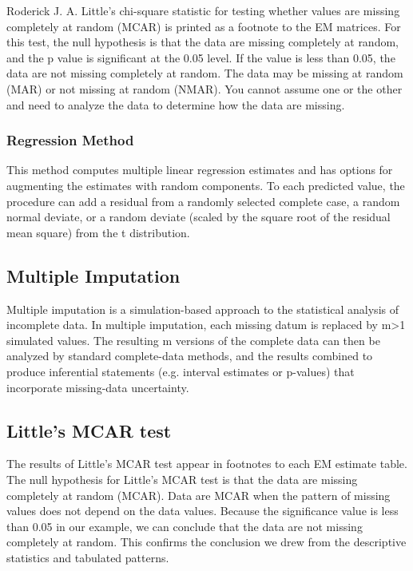 Roderick J. A. Little's chi-square statistic for testing whether values are missing completely at random (MCAR) is printed as a footnote to the EM matrices. For this test, the null hypothesis is that the data are missing completely at random, and the p value is significant at the 0.05 level. If the value is less than 0.05, the data are not missing completely at random. The data may be missing at random (MAR) or not missing at random (NMAR). You cannot assume one or the other and need to analyze the data to determine how the data are missing.

\subsubsection*{Regression Method}

This method computes multiple linear regression estimates and has options for augmenting the estimates with random components. To each predicted value, the procedure can add a residual from a randomly selected complete case, a random normal deviate, or a random deviate (scaled by the square root of the residual mean square) from the t distribution.
\subsection{Multiple Imputation}

Multiple imputation is a simulation-based approach to the statistical analysis of incomplete data. In multiple imputation, each missing datum is replaced by m>1 simulated values. The resulting m versions of the complete data can then be analyzed by standard complete-data methods, and the results combined to produce inferential statements (e.g. interval estimates or p-values) that incorporate missing-data uncertainty.

\subsection{Little's MCAR test}
The results of Little’s MCAR test appear in footnotes to each EM estimate table. The null
hypothesis for Little’s MCAR test is that the data are missing completely at random (MCAR).
Data are MCAR when the pattern of missing values does not depend on the data values. Because
the significance value is less than 0.05 in our example, we can conclude that the data are not
missing completely at random. This confirms the conclusion we drew from the descriptive
statistics and tabulated patterns.


